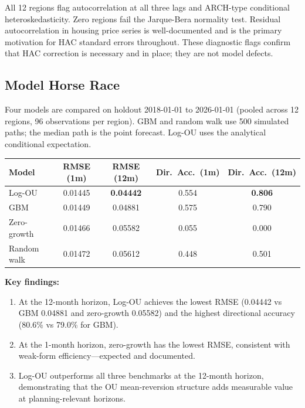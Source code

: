 \documentclass[11pt,a4paper]{article}
\theoremstyle{plain}
\theoremstyle{definition}
\begin{document}
All 12 regions flag autocorrelation at all three lags and ARCH-type
conditional heteroskedasticity.  Zero regions fail the Jarque-Bera
normality test.  Residual autocorrelation in housing price series is
well-documented \cite{case1989} and is the primary motivation for
HAC standard errors throughout.  These diagnostic flags confirm that
HAC correction is necessary and in place; they are not model defects.

\subsection{Model Horse Race}

Four models are compared on holdout 2018-01-01 to 2026-01-01
(pooled across 12 regions, 96 observations per region).
GBM and random walk use 500 simulated paths; the median path is
the point forecast.  Log-OU uses the analytical conditional expectation.

\begin{center}
\begin{tabular}{lcccc}
\toprule
Model        & RMSE (1m)  & RMSE (12m)         & Dir.\ Acc.\ (1m) & Dir.\ Acc.\ (12m) \\
\midrule
Log-OU       & 0.01445    & \textbf{0.04442}   & 0.554            & \textbf{0.806} \\
GBM          & 0.01449    & 0.04881            & 0.575            & 0.790 \\
Zero-growth  & 0.01466    & 0.05582            & 0.055            & 0.000 \\
Random walk  & 0.01472    & 0.05612            & 0.448            & 0.501 \\
\bottomrule
\end{tabular}
\end{center}

\textbf{Key findings:}
\begin{enumerate}[leftmargin=1.8em]
  \item At the 12-month horizon, Log-OU achieves the lowest RMSE
        (0.04442 vs GBM 0.04881 and zero-growth 0.05582) and the
        highest directional accuracy (80.6\% vs 79.0\% for GBM).
  \item At the 1-month horizon, zero-growth has the lowest RMSE,
        consistent with weak-form efficiency---expected and documented.
  \item Log-OU outperforms all three benchmarks at the 12-month horizon,
        demonstrating that the OU mean-reversion structure adds measurable
        value at planning-relevant horizons.
\end{enumerate}
\end{document}

